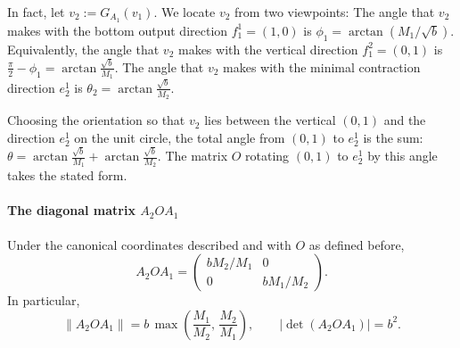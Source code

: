 \documentclass[a4paper,11pt]{article}
\theoremstyle{definition}
\begin{document}
In fact, let $v_2 := G_{A_1}(v_1)$. We locate $v_2$ from two viewpoints: The angle that $v_2$ makes with the bottom output direction $f^1_1 = (1,0)$ is $\phi_1 = \arctan(M_1/\sqrt b)$. Equivalently, the angle that $v_2$ makes with the vertical direction $f^2_1 = (0,1)$ is
$\frac{\pi}{2} - \phi_1 = \arctan\!\frac{\sqrt b}{M_1}.$ The angle that $v_2$ makes with the minimal contraction direction $e^1_2$ is $\theta_2 = \arctan\!\frac{\sqrt b}{M_2}.$

Choosing the orientation so that $v_2$ lies between the vertical $(0,1)$ and the direction $e^1_2$ on the unit circle, the total angle from $(0,1)$ to $e^1_2$ is the sum: $\theta = \arctan\!\frac{\sqrt b}{M_1} + \arctan\!\frac{\sqrt b}{M_2}.$ 
The matrix $O$ rotating $(0,1)$ to $e^1_2$ by this angle takes the stated form. 

\paragraph{The diagonal matrix $A_2 O A_1$}


Under the canonical coordinates described and with $O$ as defined before,
\begin{equation}\label{diagonal}
A_2 O A_1 = \begin{pmatrix} bM_2/M_1 & 0 \\ 0 & bM_1/M_2 \end{pmatrix}.
\end{equation}
In particular,
\[
\|A_2 O A_1\| = b\,\max\!\left(\frac{M_1}{M_2},\,\frac{M_2}{M_1}\right), \qquad |\det(A_2 O A_1)| = b^2.
\]



\end{document}
